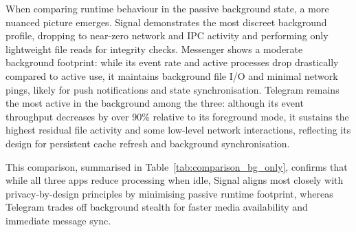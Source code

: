 \documentclass[a4paper,12pt]{report}
\begin{document}
\begin{table}[H]
    \centering
    \caption{Comparison of Network Metrics and Event Category Distribution}
    \label{tab:comparison_network_categories}
\end{table}

When comparing runtime behaviour in the passive background state, a more nuanced picture emerges. Signal demonstrates the most discreet background profile, dropping to near-zero network and IPC activity and performing only lightweight file reads for integrity checks. Messenger shows a moderate background footprint: while its event rate and active processes drop drastically compared to active use, it maintains background file I/O and minimal network pings, likely for push notifications and state synchronisation. Telegram remains the most active in the background among the three: although its event throughput decreases by over 90\% relative to its foreground mode, it sustains the highest residual file activity and some low-level network interactions, reflecting its design for persistent cache refresh and background synchronisation.

This comparison, summarised in Table~\ref{tab:comparison_bg_only}, confirms that while all three apps reduce processing when idle, Signal aligns most closely with privacy-by-design principles by minimising passive runtime footprint, whereas Telegram trades off background stealth for faster media availability and immediate message sync.
\end{document}
